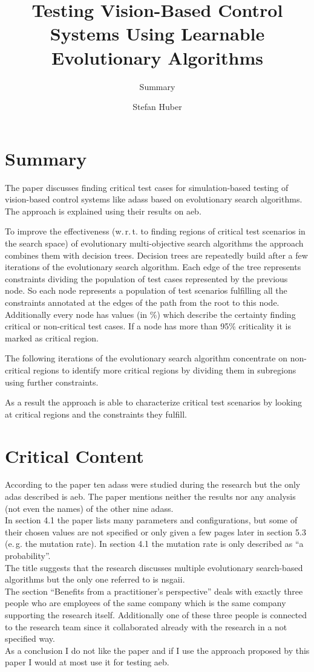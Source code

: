 \documentclass[oneside, notitlepage, twocolumn]{scrartcl}
\title{\LARGE Testing Vision-Based Control Systems Using Learnable Evolutionary Algorithms}
\subtitle{Summary}
\author{Stefan Huber}
\newcommand{\eg}{e.\,g.\xspace}
\newcommand{\wrt}{w.\,r.\,t.\xspace}
\begin{document}
\maketitle

\section{Summary}
The paper discusses finding critical test cases for simulation-based testing of vision-based control systems like \glspl{adas} based on evolutionary search algorithms.
The approach is explained using their results on \gls{aeb}.\par
To improve the effectiveness (\wrt to finding regions of critical test scenarios in the search space) of evolutionary multi-objective search algorithms the approach combines them with decision trees.
Decision trees are repeatedly build after a few iterations of the evolutionary search algorithm.
Each edge of the tree represents constraints dividing the population of test cases represented by the previous node.
So each node represents a population of test scenarios fulfilling all the constraints annotated at the edges of the path from the root to this node.
Additionally every node has values (in \%) which describe the certainty finding critical or non-critical test cases.
If a node has more than 95\% criticality it is marked as critical region.\par
The following iterations of the evolutionary search algorithm concentrate on non-critical regions to identify more critical regions by dividing them in subregions using further constraints.\par
As a result the approach is able to characterize critical test scenarios by looking at critical regions and the constraints they fulfill.

\section{Critical Content}
According to the paper ten \glspl{adas} were studied during the research but the only \gls{adas} described is \gls{aeb}.
The paper mentions neither the results nor any analysis (not even the names) of the other nine \glspl{adas}.\\
In section 4.1 the paper lists many parameters and configurations, but some of their chosen values are not specified or only given a few pages later in section 5.3 (\eg{} the mutation rate).
In section 4.1 the mutation rate is only described as ``a probability''.\\
The title suggests that the research discusses multiple evolutionary search-based algorithms but the only one referred to is \gls{nsgaii}.\\
The section ``Benefits from a practitioner's perspective'' deals with exactly three people who are employees of the same company which is the same company supporting the research itself.
Additionally one of these three people is connected to the research team since it collaborated already with the research in a not specified way.\\
As a conclusion I do not like the paper and if I use the approach proposed by this paper I would at most use it for testing \gls{aeb}.
\end{document}
